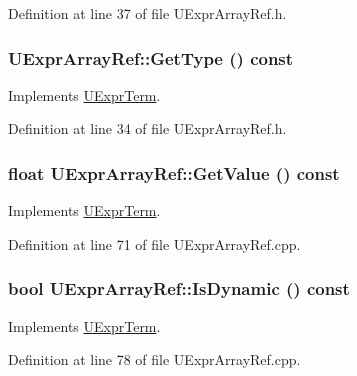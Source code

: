 Definition at line 37 of file UExprArrayRef.h.\hypertarget{class_u_expr_array_ref_89284f8ec703cb0dd7314a731c593f3d}{
\subsubsection[{GetType}]{ UExprArrayRef::GetType () const}}
\label{class_u_expr_array_ref_89284f8ec703cb0dd7314a731c593f3d}




Implements \hyperlink{class_u_expr_term_fc66ae4dfe6a112d107183840d753562}{UExprTerm}.

Definition at line 34 of file UExprArrayRef.h.\hypertarget{class_u_expr_array_ref_de2f52b193a937e90bf8ceb1dd99ca40}{
\subsubsection[{GetValue}]{\setlength{\rightskip}{0pt plus 5cm}float UExprArrayRef::GetValue () const}}
\label{class_u_expr_array_ref_de2f52b193a937e90bf8ceb1dd99ca40}




Implements \hyperlink{class_u_expr_term_85274403764fb0e4cc701a0374fd6592}{UExprTerm}.

Definition at line 71 of file UExprArrayRef.cpp.\hypertarget{class_u_expr_array_ref_f5b291cf643bde2446086dabf8227ce8}{
\subsubsection[{IsDynamic}]{\setlength{\rightskip}{0pt plus 5cm}bool UExprArrayRef::IsDynamic () const}}
\label{class_u_expr_array_ref_f5b291cf643bde2446086dabf8227ce8}




Implements \hyperlink{class_u_expr_term_0b0a24c60fecb1a7388e4b01e2f73572}{UExprTerm}.

Definition at line 78 of file UExprArrayRef.cpp.

